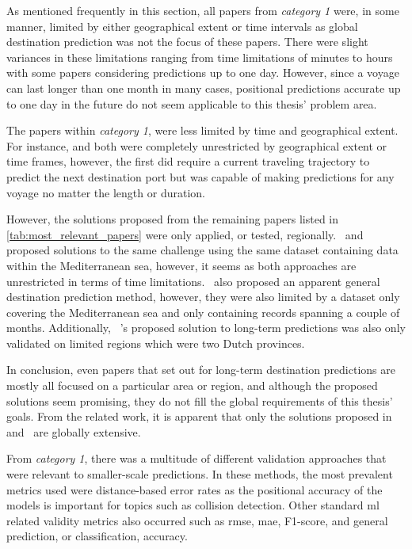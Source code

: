 
As mentioned frequently in this section, all papers from \textit{category 1} were, in some manner, limited by either geographical extent or time intervals as global destination prediction was not the focus of these papers. There were slight variances in these limitations ranging from time limitations of minutes to hours with some papers considering predictions up to one day. However, since a voyage can last longer than one month in many cases, positional predictions accurate up to one day in the future do not seem applicable to this thesis' problem area.

The papers within \textit{category 1}, were less limited by time and geographical extent. For instance, \cite{Zhang2020AISApproach} and \cite{lechtenberg2019} both were completely unrestricted by geographical extent or time frames, however, the first did require a current traveling trajectory to predict the next destination port but was capable of making predictions for any voyage no matter the length or duration.

However, the solutions proposed from the remaining papers listed in \cref{tab:most_relevant_papers} were only applied, or tested, regionally.~\cite{Rosca2018GrandRoutes} and~\cite{Bachar2018GrandDestination} proposed solutions to the same challenge using the same dataset containing data within the Mediterranean sea, however, it seems as both approaches are unrestricted in terms of time limitations.~\cite{Karatas2020TrajectoryData} also proposed an apparent general destination prediction method, however, they were also limited by a dataset only covering the Mediterranean sea and only containing records spanning a couple of months. Additionally, ~\cite{Dobrkovic2018MaritimeData}'s proposed solution to long-term predictions was also only validated on limited regions which were two Dutch provinces.

In conclusion, even papers that set out for long-term destination predictions are mostly all focused on a particular area or region, and although the proposed solutions seem promising, they do not fill the global requirements of this thesis' goals. From the related work, it is apparent that only the solutions proposed in~\cite{lechtenberg2019} and~\cite{Zhang2020AISApproach} are globally extensive.


From \textit{category 1}, there was a multitude of different validation approaches that were relevant to smaller-scale predictions. In these methods, the most prevalent metrics used were distance-based error rates as the positional accuracy of the models is important for topics such as collision detection. Other standard \acrshort{ml} related validity metrics also occurred such as \acrfull{rmse}, \acrfull{mae}, F1-score, and general prediction, or classification, accuracy.

